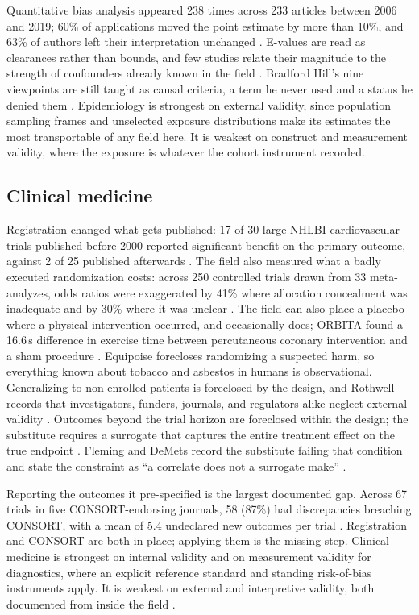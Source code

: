 \documentclass{article}
\begin{document}
Quantitative bias analysis appeared 238 times across 233 articles between 2006 and 2019; 60\% of applications moved the point estimate by more than 10\%, and 63\% of authors left their interpretation unchanged \citep{petersen2021systematic}. E-values are read as clearances rather than bounds, and few studies relate their magnitude to the strength of confounders already known in the field \citep{blum2020use}. Bradford Hill's nine viewpoints are still taught as causal criteria, a term he never used and a status he denied them \citep{phillips2004missed}. Epidemiology is strongest on external validity, since population sampling frames and unselected exposure distributions make its estimates the most transportable of any field here. It is weakest on construct and measurement validity, where the exposure is whatever the cohort instrument recorded.

\subsection{Clinical medicine}

Registration changed what gets published: 17 of 30 large NHLBI cardiovascular trials published before 2000 reported significant benefit on the primary outcome, against 2 of 25 published afterwards \citep{kaplan2015likelihood}. The field also measured what a badly executed randomization costs: across 250 controlled trials drawn from 33 meta-analyzes, odds ratios were exaggerated by 41\% where allocation concealment was inadequate and by 30\% where it was unclear \citep{schulz1995empirical}. The field can also place a placebo where a physical intervention occurred, and occasionally does; ORBITA found a 16.6\,s difference in exercise time between percutaneous coronary intervention and a sham procedure \citep{alhabib2018orbita}. Equipoise forecloses randomizing a suspected harm, so everything known about tobacco and asbestos in humans is observational. Generalizing to non-enrolled patients is foreclosed by the design, and Rothwell records that investigators, funders, journals, and regulators alike neglect external validity \citep{rothwell2005external}. Outcomes beyond the trial horizon are foreclosed within the design; the substitute requires a surrogate that captures the entire treatment effect on the true endpoint \citep{prentice1989surrogate}. Fleming and DeMets record the substitute failing that condition and state the constraint as ``a correlate does not a surrogate make'' \citep{fleming1996surrogate}.

Reporting the outcomes it pre-specified is the largest documented gap. Across 67 trials in five CONSORT-endorsing journals, 58 (87\%) had discrepancies breaching CONSORT, with a mean of 5.4 undeclared new outcomes per trial \citep{goldacre2019compare}. Registration and CONSORT are both in place; applying them is the missing step. Clinical medicine is strongest on internal validity and on measurement validity for diagnostics, where an explicit reference standard and standing risk-of-bias instruments apply. It is weakest on external and interpretive validity, both documented from inside the field \citep{rothwell2005external, goldacre2019compare}.
\end{document}
